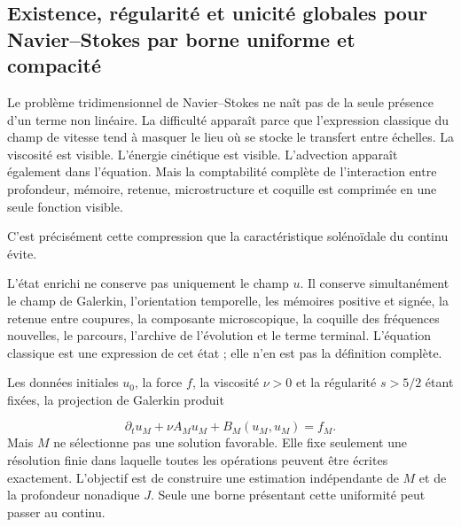 \subsection{Existence, régularité et unicité globales pour Navier–Stokes par borne uniforme et compacité}
Le problème tridimensionnel de Navier–Stokes ne naît pas de la seule présence d’un terme non linéaire. La difficulté apparaît parce que l’expression classique du champ de vitesse tend à masquer le lieu où se stocke le transfert entre échelles. La viscosité est visible. L’énergie cinétique est visible. L’advection apparaît également dans l’équation. Mais la comptabilité complète de l’interaction entre profondeur, mémoire, retenue, microstructure et coquille est comprimée en une seule fonction visible.\par
C’est précisément cette compression que la caractéristique solénoïdale du continu évite.\par
L’état enrichi ne conserve pas uniquement le champ \(u\). Il conserve simultanément le champ de Galerkin, l’orientation temporelle, les mémoires positive et signée, la retenue entre coupures, la composante microscopique, la coquille des fréquences nouvelles, le parcours, l’archive de l’évolution et le terme terminal. L’équation classique est une expression de cet état ; elle n’en est pas la définition complète.\par
Les données initiales \(u_0\), la force \(f\), la viscosité \(\nu>0\) et la régularité \(s>5/2\) étant fixées, la projection de Galerkin produit\par
\[
\partial_tu_M+\nu A_Mu_M+B_M(u_M,u_M)=f_M.
\]
Mais \(M\) ne sélectionne pas une solution favorable. Elle fixe seulement une résolution finie dans laquelle toutes les opérations peuvent être écrites exactement. L’objectif est de construire une estimation indépendante de \(M\) et de la profondeur nonadique \(J\). Seule une borne présentant cette uniformité peut passer au continu.\par
{}
